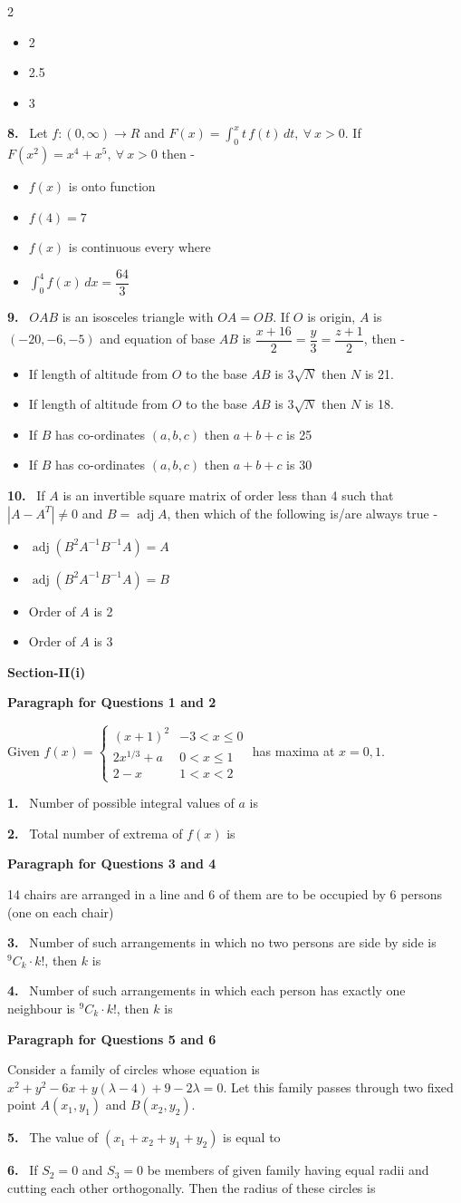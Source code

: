 \documentclass[10pt]{extarticle}
\newcommand{\sect}[1]{\par\smallskip\noindent\textbf{#1}\par}
\newcommand{\qn}[1]{\par\smallskip\noindent\textbf{#1.}~}
\newcommand{\paraq}[2]{\par\smallskip\noindent\textbf{Paragraph for Questions #1 and #2}\par}
\newenvironment{qoptions}{\begin{itemize}[leftmargin=1.8em,itemsep=1pt,topsep=2pt,label={}]}{\end{itemize}}
\newcommand{\opt}[2]{\item[(#1)] #2}
\begin{document}
\begin{multicols}{2}
\begin{qoptions}
\opt{B}{2}
\opt{C}{2.5}
\opt{D}{3}
\end{qoptions}
\qn{8} Let $f:(0,\infty)\to R$ and $F(x)=\displaystyle\int_0^x t\,f(t)\,dt,\ \forall\ x>0$. If $F(x^2)=x^4+x^5,\ \forall\ x>0$ then -
\begin{qoptions}
\opt{A}{$f(x)$ is onto function}
\opt{B}{$f(4)=7$}
\opt{C}{$f(x)$ is continuous every where}
\opt{D}{$\displaystyle\int_0^4 f(x)\,dx=\dfrac{64}{3}$}
\end{qoptions}
\qn{9} $OAB$ is an isosceles triangle with $OA=OB$. If $O$ is origin, $A$ is $(-20,-6,-5)$ and equation of base $AB$ is $\dfrac{x+16}{2}=\dfrac{y}{3}=\dfrac{z+1}{2}$, then -
\begin{qoptions}
\opt{A}{If length of altitude from $O$ to the base $AB$ is $3\sqrt N$ then $N$ is 21.}
\opt{B}{If length of altitude from $O$ to the base $AB$ is $3\sqrt N$ then $N$ is 18.}
\opt{C}{If $B$ has co-ordinates $(a,b,c)$ then $a+b+c$ is 25}
\opt{D}{If $B$ has co-ordinates $(a,b,c)$ then $a+b+c$ is 30}
\end{qoptions}
\qn{10} If $A$ is an invertible square matrix of order less than 4 such that $|A-A^T|\ne0$ and $B=\operatorname{adj}A$, then which of the following is/are always true -
\begin{qoptions}
\opt{A}{$\operatorname{adj}(B^2A^{-1}B^{-1}A)=A$}
\opt{B}{$\operatorname{adj}(B^2A^{-1}B^{-1}A)=B$}
\opt{C}{Order of $A$ is 2}
\opt{D}{Order of $A$ is 3}
\end{qoptions}
\sect{Section-II(i)}
\paraq{1}{2}
Given $f(x)=\begin{cases}(x+1)^2 & -3<x\le0\\[2pt] 2x^{1/3}+a & 0<x\le1\\[2pt] 2-x & 1<x<2\end{cases}$ has maxima at $x=0,1$.
\qn{1} Number of possible integral values of $a$ is
\qn{2} Total number of extrema of $f(x)$ is
\paraq{3}{4}
14 chairs are arranged in a line and 6 of them are to be occupied by 6 persons (one on each chair)
\qn{3} Number of such arrangements in which no two persons are side by side is $^9C_k\cdot k!$, then $k$ is
\qn{4} Number of such arrangements in which each person has exactly one neighbour is $^9C_k\cdot k!$, then $k$ is
\paraq{5}{6}
Consider a family of circles whose equation is $x^2+y^2-6x+y(\lambda-4)+9-2\lambda=0$. Let this family passes through two fixed point $A(x_1,y_1)$ and $B(x_2,y_2)$.
\qn{5} The value of $(x_1+x_2+y_1+y_2)$ is equal to
\qn{6} If $S_2=0$ and $S_3=0$ be members of given family having equal radii and cutting each other orthogonally. Then the radius of these circles is

\end{multicols}
\end{document}
